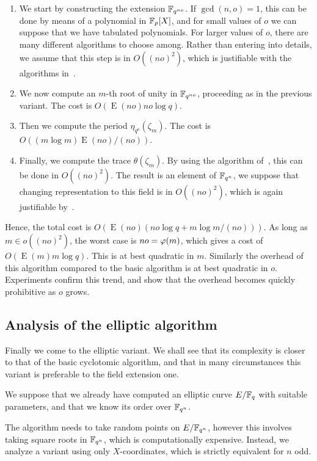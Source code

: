 \documentclass{article}
\DeclareMathOperator{\Ext}{E}
\begin{document}
\begin{enumerate}
\item We start by constructing the extension $\mathbb{F}_{q^{no}}$. If
  $\gcd(n,o)=1$, this can be done by means of a polynomial in
  $\mathbb{F}_p[X]$, and for small values of $o$ we can suppose that we have
  tabulated polynomials. For larger values of $o$, there are many
  different algorithms to choose among. Rather than entering into
  details, we assume that this step is in $O\left((no)^2\right)$,
  which is justifiable with the algorithms in~\cite{}.
\item We now compute an $m$-th root of unity in $\mathbb{F}_{q^{no}}$,
  proceeding as in the previous variant. The cost is $O(\Ext(no)no\log
  q)$.
\item Then we compute the period $\eta_{q^o}(\zeta_m)$. The cost is
  $O((m\log m)\Ext(no)/(no))$. 
\item Finally, we compute the trace $\theta(\zeta_m)$. By using the
  algorithm of~\cite{}, this can be done in
  $O\left((no)^2\right)$. The result is an element of $\mathbb{F}_{q^n}$, we
  suppose that changing representation to this field is in
  $O\left((no)^2\right)$, which is again justifiable by~\cite{}.
\end{enumerate}

Hence, the total cost is $O(\Ext(no)(no\log q + m\log m/(no)))$. As
long as $m\in o\left((no)^2\right)$, the worst case is $no=\varphi(m)$,
which gives a cost of $O(\Ext(m)m\log q)$. This is at best quadratic
in $m$. Similarly the overhead of this algorithm compared to the basic
algorithm is at best quadratic in $o$. Experiments confirm this trend,
and show that the overhead becomes quickly prohibitive as $o$ grows.


\subsection{Analysis of the elliptic algorithm}

Finally we come to the elliptic variant. We shall see that its
complexity is closer to that of the basic cyclotomic algorithm, and
that in many circumstances this variant is preferable to the field
extension one.

We suppose that we already have computed an elliptic curve $E/\mathbb{F}_q$
with suitable parameters, and that we know its order over $\mathbb{F}_{q^n}$.

The algorithm needs to take random points on $E/\mathbb{F}_{q^n}$, however
this involves taking square roots in $\mathbb{F}_{q^n}$, which is
computationally expensive. Instead, we analyze a variant using only
$X$-coordinates, which is strictly equivalent for $n$ odd.
\end{document}
